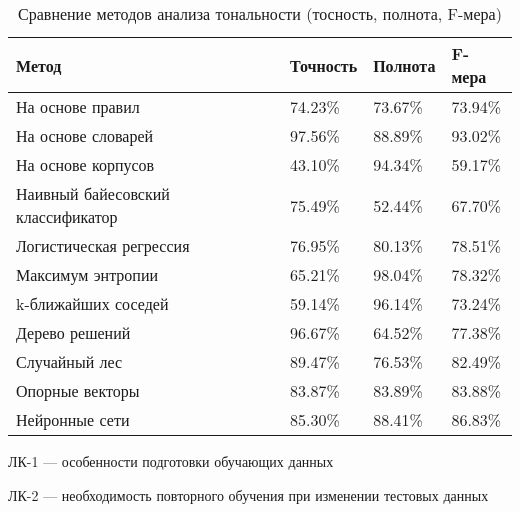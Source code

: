 \noindent
\captionsetup{format=hang,justification=raggedright,
              singlelinecheck=off,width=14.6cm}
\begin{longtable}[c]{|p{5cm}|p{2cm}|p{2cm}|p{1.6cm}|}
\caption{Сравнение методов анализа тональности (тосность, полнота,
         F-мера)\label{tab:02}}\\
    \hline
    \textbf{Метод} & \textbf{Точность} & \textbf{Полнота}
                   & \textbf{F-мера}\\
    \hline
    На основе правил    & 74.23\% 
                        & 73.67\% & 73.94\%\\
    \hline
    На основе словарей  & 97.56\% 
                        & 88.89\% & 93.02\%\\
    \hline
    На основе корпусов  & 43.10\%
                        & 94.34\% & 59.17\%\\
    \hline
    Наивный
    байесовский
    классификатор       & 75.49\%
                        & 52.44\% & 67.70\%\\
    \hline
    Логистическая
    регрессия           & 76.95\% 
                        & 80.13\% & 78.51\%\\
    \hline
    Максимум энтропии   & 65.21\%
                        & 98.04\% & 78.32\%\\
    \hline
    k-ближайших соседей & 59.14\% 
                        & 96.14\% & 73.24\%\\
    \hline
    Дерево решений      & 96.67\% 
                        & 64.52\% & 77.38\%\\
    \hline
    Случайный лес       & 89.47\% 
                        & 76.53\% & 82.49\%\\
    \hline
    Опорные векторы     & 83.87\%
                        & 83.89\% & 83.88\%\\
    \hline
    Нейронные сети      & 85.30\% 
                        & 88.41\% & 86.83\%\\
    \hline
\end{longtable}

ЛК-1 --- особенности подготовки обучающих данных 

ЛК-2 --- необходимость повторного обучения при изменении тестовых данных

